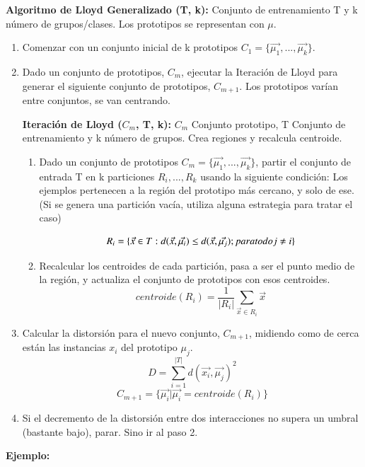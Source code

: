 \documentclass[12pt]{report} %
\begin{document}
\textbf{Algoritmo de Lloyd Generalizado (T, k):} Conjunto de entrenamiento T y k número de grupos/clases. Los prototipos se representan con $\mu$.

\begin{enumerate}
  \item Comenzar con un conjunto inicial de k prototipos $C_1 = \{\vec{\mu_1}, ..., \vec{\mu_k} \}$.
  \item Dado un conjunto de prototipos, $C_m$, ejecutar la Iteración de Lloyd para generar el siguiente conjunto de prototipos, $C_{m+1}$. Los prototipos varían entre conjuntos, se van centrando.
  
  \textbf{Iteración de Lloyd ($C_m$, T, k):} $C_m$ Conjunto prototipo, T Conjunto de entrenamiento y k número de grupos. Crea regiones y recalcula centroide.
  \begin{enumerate}
    \item Dado un conjunto de prototipos $C_m = \{\vec{\mu_1}, ..., \vec{\mu_k} \}$, partir el conjunto de entrada T en k particiones $R_i, ..., R_k$ usando la siguiente condición: Los ejemplos pertenecen a la región del prototipo más cercano, y solo de ese. (Si se genera una partición vacía, utiliza alguna estrategia para tratar el caso)
    
    $$R_i = \{ \vec{x} \in T: d(\vec{x}, \vec{\mu_i}) \leq d(\vec{x}, \vec{\mu_j}); \space para \space todo \space j \neq i \}$$
    
    \item Recalcular los centroides de cada partición, pasa a ser el punto medio de la región, y actualiza el conjunto de prototipos con esos centroides.
    $$centroide(R_i) = \frac{1}{|R_i|} \sum_{\vec{x} \in R_i} \vec{x}$$
  \end{enumerate}
  \item Calcular la distorsión para el nuevo conjunto, $C_{m+1}$, midiendo como de cerca están las instancias $x_i$ del prototipo $\mu_j$.
  $$D = \sum^{|T|}_{i=1} d( \vec{x_i}, \vec{\mu_j})^2$$
  $$C_{m+1} = \{\vec{\mu_i}|\vec{\mu_i} = centroide(R_i) \}$$
  \item Si el decremento de la distorsión entre dos interacciones no supera un umbral (bastante bajo), parar. Sino ir al paso 2. 
\end{enumerate}

\newpage

\textbf{Ejemplo:}
\end{document}
